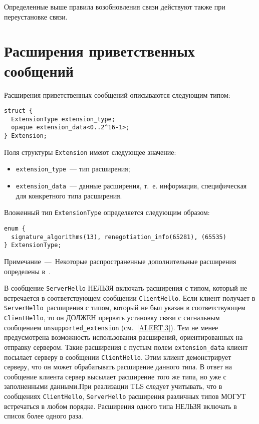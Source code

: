 Определенные выше правила возобновления связи 
действуют также при переустановке связи. 

\section{Расширения приветственных сообщений}\label{HANDSHAKE.7}

Расширения приветственных сообщений описываются следующим типом:
\begin{lstlisting}
struct {
  ExtensionType extension_type;
  opaque extension_data<0..2^16-1>;
} Extension;
\end{lstlisting}

Поля структуры \lstinline{Extension} имеют следующее значение:
\begin{itemize}
\item[--]
\lstinline{extension_type}~--- тип расширения;

\item[--]
\lstinline{extension_data}~--- данные расширения, т.~е. информация, 
специфическая для конкретного типа расширения. 
\end{itemize}

Вложенный тип \lstinline{ExtensionType} определяется следующим образом:
\begin{lstlisting}
enum {
  signature_algorithms(13), renegotiation_info(65281), (65535)
} ExtensionType;
\end{lstlisting}

\begin{note}
Примечание~---~Некоторые распространенные дополнительные расширения определены 
в~\cite{RFC6066}.
\end{note} 

В сообщение \lstinline{ServerHello} НЕЛЬЗЯ включать расширения с типом,
который не встречается в соответствующем сообщении \lstinline{ClientHello}.
Если клиент получает в \mbox{\lstinline{ServerHello} расширения} с типом, который
не был указан в соответствующем \lstinline{ClientHello}, то он ДОЛЖЕН
прервать установку связи с сигнальным сообщением
\lstinline{unsupported_extension} (см.~\ref{ALERT.3}). Тем не менее
предусмотрена возможность использования расширений, ориентированных на
отправку сервером. Такие расширения с пустым полем
\lstinline{extension_data} клиент посылает серверу в сообщении
\lstinline{ClientHello}. Этим клиент демонстрирует серверу, что он может
обрабатывать расширение данного типа. В ответ на сообщение клиента сервер
высылает расширение того же типа, но уже с заполненными данными.При
реализации TLS следует учитывать, что в сообщениях \lstinline{ClientHello},
\lstinline{ServerHello} расширения различных типов МОГУТ встречаться в
любом порядке. Расширения одного типа НЕЛЬЗЯ включать в список более одного
раза.

